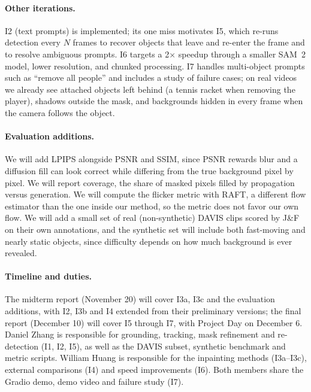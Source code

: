 \documentclass[11pt]{article}
\begin{document}
\paragraph{Other iterations.} I2 (text prompts) is implemented; its one miss motivates I5, which re-runs detection every $N$ frames to recover objects that leave and re-enter the frame and to resolve ambiguous prompts. I6 targets a 2$\times$ speedup through a smaller SAM~2 model, lower resolution, and chunked processing. I7 handles multi-object prompts such as ``remove all people'' and includes a study of failure cases; on real videos we already see attached objects left behind (a tennis racket when removing the player), shadows outside the mask, and backgrounds hidden in every frame when the camera follows the object.

\paragraph{Evaluation additions.} We will add LPIPS alongside PSNR and SSIM, since PSNR rewards blur and a diffusion fill can look correct while differing from the true background pixel by pixel. We will report coverage, the share of masked pixels filled by propagation versus generation. We will compute the flicker metric with RAFT, a different flow estimator than the one inside our method, so the metric does not favor our own flow. We will add a small set of real (non-synthetic) DAVIS clips scored by J\&F on their own annotations, and the synthetic set will include both fast-moving and nearly static objects, since difficulty depends on how much background is ever revealed.

\paragraph{Timeline and duties.} The midterm report (November 20) will cover I3a, I3c and the evaluation additions, with I2, I3b and I4 extended from their preliminary versions; the final report (December 10) will cover I5 through I7, with Project Day on December 6. Daniel Zhang is responsible for grounding, tracking, mask refinement and re-detection (I1, I2, I5), as well as the DAVIS subset, synthetic benchmark and metric scripts. William Huang is responsible for the inpainting methods (I3a--I3c), external comparisons (I4) and speed improvements (I6). Both members share the Gradio demo, demo video and failure study (I7).
\end{document}
